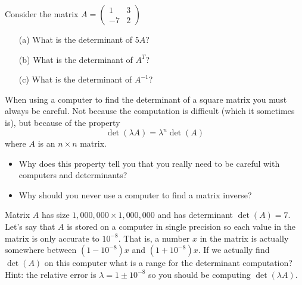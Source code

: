 \begin{problem}
    Consider the matrix $A = \begin{pmatrix} 1 & 3 \\ -7 & 2 \end{pmatrix}$
    \begin{enumerate}
        \item[(a)] What is the determinant of $5A$?
        \item[(b)] What is the determinant of $A^T$?
        \item[(c)] What is the determinant of $A^{-1}$?
    \end{enumerate}
\end{problem}

\begin{problem}
    When using a computer to find the determinant of a square matrix you must always be careful.  Not because the
    computation is difficult (which it sometimes is), but because of the property
    \[ \det(\lambda A) = \lambda^n \det(A) \]
    where $A$ is an $n \times n$ matrix.

    \begin{itemize}
        \item Why does this property tell you that you really need to be careful with computers and
            determinants?  
        \item Why should you never use a computer to find a matrix inverse?
    \end{itemize}
\end{problem}


\begin{problem}
    Matrix $A$ has size $1,000,000 \times 1,000,000$ and has determinant $\det(A) = 7$.  Let's say
    that $A$ is stored on a computer in single precision so each value in the matrix is
    only accurate to $10^{-8}$.  That is, a number $x$ in the matrix is actually somewhere
    between $(1-10^{-8})x$ and $(1+10^{-8})x$.  If we actually find $\det(A)$ on this
    computer what is a range for the determinant computation? \\
    Hint: the relative error is $\lambda = 1 \pm 10^{-8}$ so you should be computing
    $\det(\lambda A)$.
\end{problem}



